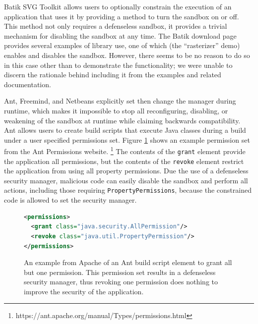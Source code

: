 \documentclass{sig-alternate}
\begin{document}
Batik SVG Toolkit allows users to optionally constrain the execution of an application
that uses it by providing a method to turn the sandbox on or off. 
This method
not only requires a defenseless sandbox, it provides a trivial mechanism for
disabling the sandbox at any time. The Batik download page
provides several examples of library use, one of which (the
``rasterizer'' demo) enables and disables the sandbox.  However, there seems to
be no reason to do so in this case other than to demonstrate the functionality;
we were unable to discern the rationale behind including it from the examples
and related documentation.


Ant, Freemind, and Netbeans explicitly set then change the manager
during runtime, which makes it impossible to stop all reconfiguring, disabling,
or weakening of the sandbox at runtime while claiming backwards
compatibility. Ant allows users to create build scripts that 
execute Java classes during a build under a user specified
permissions set. Figure \ref{fig:Ant Permissions Example}
shows an example permission set from the Ant Permissions website.%
\footnote{https://ant.apache.org/manual/Types/permissions.html%
} The contents of the \texttt{grant} element provide the application
all permissions, but the contents of the \texttt{revoke} element restrict
the application from using all property permissions. Due the use of a
defenseless security manager, malicious code can easily disable the sandbox and perform all actions,
including those requiring \texttt{PropertyPermissions}, because the constrained code is allowed to set the security manager.

\begin{figure}
\begin{lstlisting}[language=XML,basicstyle={\scriptsize}]
<permissions>   
  <grant class="java.security.AllPermission"/>   
  <revoke class="java.util.PropertyPermission"/> 
</permissions>
\end{lstlisting}

\caption{An example from Apache of an Ant build script element to grant all but one permission. This permission set results in a defenseless security manager, thus revoking one permission does nothing to improve the security of the application.}
\label{fig:Ant Permissions Example}
\end{figure}
\end{document}
